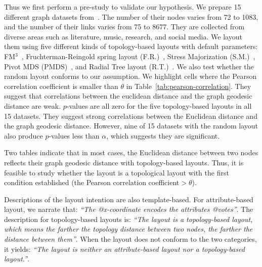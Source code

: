 Thus we first perform a pre-study to validate our hypothesis.
We prepare 15 different graph datasets from~\cite{DBLP:journals/tvcg/ZhuCHHLZ21}.
The number of their nodes varies from 72 to 1083, and the number of their links varies from 75 to 8677.
They are collected from diverse areas such as literature, music, research, and social media.
We layout them using five different kinds of topology-based layouts with default parameters: FM$^3$~\cite{hachul2004drawing}, Fruchterman-Reingold spring layout (F.R.)~\cite{DBLP:journals/spe/FruchtermanR91}, Stress Majorization (S.M.)~\cite{DBLP:conf/gd/GansnerKN04}, Pivot MDS (PMDS)~\cite{DBLP:conf/gd/BrandesP06}, and Radial Tree layout (R.T.)~\cite{DBLP:conf/infovis/Jankun-KellyM03}.
We also test whether the random layout conforms to our assumption.
We highlight cells where the Pearson correlation coefficient is smaller than $\theta$ in Table~\ref{tab:pearson-correlation}.
They suggest that correlations between the euclidean distance and the graph geodesic distance are weak.
$p$-values are all zero for the five topology-based layouts in all 15 datasets.
They suggest strong correlations between the Euclidean distance and the graph geodesic distance.
However, nine of 15 datasets with the random layout also produce $p$-values less than $\alpha$, which suggests they are significant.

Two tables indicate that in most cases, the Euclidean distance between two nodes reflects their graph geodesic distance with topology-based layouts.
Thus, it is feasible to study whether the layout is a topological layout with the first condition established (the Pearson correlation coefficient$>\theta$).

Descriptions of the layout intention are also template-based.
For attribute-based layout, we narrate that: \textit{``The @x-coordinate encodes the attributes @votes''}.
The description for topology-based layouts is: \textit{``The layout is a topology-based layout, which means the farther the topology distance between two nodes, the farther the distance between them''}.
When the layout does not conform to the two categories, it yields: \textit{``The layout is neither an attribute-based layout nor a topology-based layout.''}.

